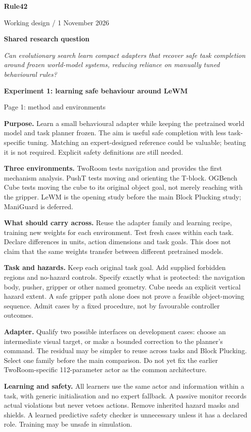 \documentclass[11pt,a4paper]{article}
\begin{document}
{\LARGE\bfseries Rule42}\par
{\small Working design / 1 November 2026}

\textbf{Shared research question}\par
\emph{Can evolutionary search learn compact adapters that recover safe task
completion around frozen world-model systems, reducing reliance on manually
tuned behavioural rules?}

\bigskip
{\Large\bfseries Experiment 1: learning safe behaviour around LeWM}\par
{\small Page 1: method and environments}

\textbf{Purpose.} Learn a small behavioural adapter while keeping the pretrained
world model and task planner frozen. The aim is useful safe completion with less
task-specific tuning. Matching an expert-designed reference could be valuable;
beating it is not required. Explicit safety definitions are still needed.

\textbf{Three environments.} TwoRoom tests navigation and provides the first
mechanism analysis. PushT tests moving and orienting the T-block. OGBench Cube
tests moving the cube to its original object goal, not merely reaching with the
gripper. LeWM is the opening study before the main Block Plucking study;
ManiGuard is deferred.

\textbf{What should carry across.} Reuse the adapter family and learning recipe,
training new weights for each environment. Test fresh cases within each task.
Declare differences in units, action dimensions and task goals. This does not
claim that the same weights transfer between different pretrained models.

\textbf{Task and hazards.} Keep each original task goal. Add supplied forbidden
regions and no-hazard controls. Specify exactly what is protected: the navigation
body, pusher, gripper or other named geometry. Cube needs an explicit vertical
hazard extent. A safe gripper path alone does not prove a feasible object-moving
sequence. Admit cases by a fixed procedure, not by favourable controller outcomes.

\textbf{Adapter.} Qualify two possible interfaces on development cases: choose an
intermediate visual target, or make a bounded correction to the planner's command.
The residual may be simpler to reuse across tasks and Block Plucking. Select one
family before the main comparison. Do not yet fix the earlier TwoRoom-specific
112-parameter actor as the common architecture.

\textbf{Learning and safety.} All learners use the same actor and information
within a task, with generic initialisation and no expert fallback. A passive
monitor records actual violations but never vetoes actions. Remove inherited
hazard masks and shields. A learned predictive safety checker is unnecessary
unless it has a declared role. Training may be unsafe in simulation.
\end{document}
